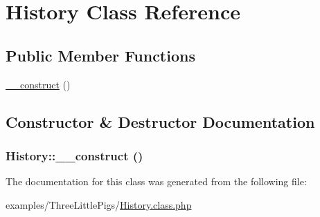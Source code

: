 \hypertarget{class_history}{
\section{History Class Reference}
\label{class_history}
}
\subsection*{Public Member Functions}
\begin{CompactItemize}
\item 
\hyperlink{class_history_b6e145cb886ba3fdbca030285b402894}{\_\-\_\-construct} ()
\end{CompactItemize}


\subsection{Constructor \& Destructor Documentation}
\hypertarget{class_history_b6e145cb886ba3fdbca030285b402894}{
\subsubsection[{\_\-\_\-construct}]{\setlength{\rightskip}{0pt plus 5cm}History::\_\-\_\-construct ()}}
\label{class_history_b6e145cb886ba3fdbca030285b402894}




The documentation for this class was generated from the following file:\begin{CompactItemize}
\item 
examples/ThreeLittlePigs/\hyperlink{_history_8class_8php}{History.class.php}\end{CompactItemize}
